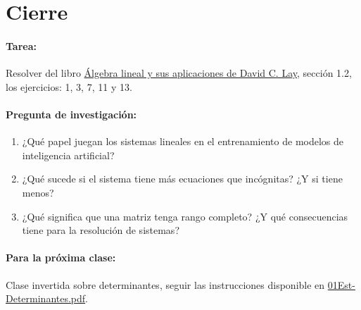 \documentclass[a4,11pt]{aleph-notas}
\begin{document}
\section*{Cierre}  

\paragraph{Tarea:}  
Resolver del libro \href{https://catalogobiblioteca.puce.edu.ec/cgi-bin/koha/opac-detail.pl?biblionumber=86083&query_desc=kw%2Cwrdl%3A%20%C3%81lgebra%20lineal%20y%20sus%20aplicaciones}{Álgebra lineal y sus aplicaciones de David C. Lay}, sección 1.2, los ejercicios: 1, 3, 7, 11 y 13.

\paragraph{Pregunta de investigación:}  
\begin{enumerate}[leftmargin=*]  
    \item ¿Qué papel juegan los sistemas lineales en el entrenamiento de modelos de inteligencia artificial?
    \item ¿Qué sucede si el sistema tiene más ecuaciones que incógnitas? ¿Y si tiene menos?  
    \item ¿Qué significa que una matriz tenga rango completo? ¿Y qué consecuencias tiene para la resolución de sistemas?
\end{enumerate}  

\paragraph{Para la próxima clase:}  
Clase invertida sobre determinantes, seguir las instrucciones disponible en \href{https://fcena-puce.github.io/FCENA-PUCE/AlgLinealyGeomAnalitica-05-N0068/2-ClaseInvertida/00Est-Determinantes.pdf}{01Est-Determinantes.pdf}.  
\end{document}
